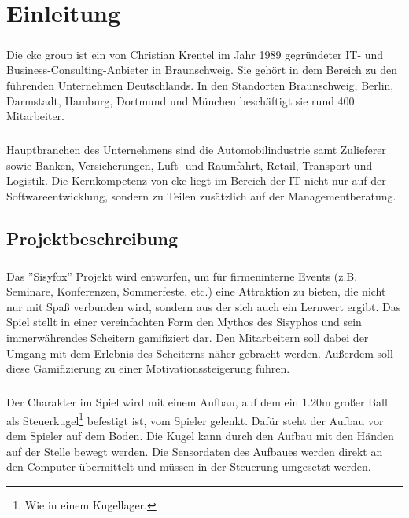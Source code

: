 \chapter{Einleitung}
\paragraph{}
Die ckc group ist ein von Christian Krentel im Jahr 1989 gegründeter IT- und Business-Consulting-Anbieter in Braunschweig. Sie gehört in dem Bereich zu den führenden Unternehmen Deutschlands. In den Standorten Braunschweig, Berlin, Darmstadt, Hamburg, Dortmund und München beschäftigt sie rund 400 Mitarbeiter.
\paragraph{}
Hauptbranchen des Unternehmens sind die Automobilindustrie samt Zulieferer sowie Banken, Versicherungen, Luft- und Raumfahrt, Retail, Transport und Logistik. Die Kernkompetenz von ckc liegt im Bereich der IT nicht nur auf der 
Softwareentwicklung, sondern zu Teilen zusätzlich auf der Managementberatung.

\section{Projektbeschreibung}
\paragraph{}
Das ”Sisyfox” Projekt wird entworfen, um für firmeninterne Events (z.B. Seminare, Konferenzen, Sommerfeste, etc.) eine Attraktion zu bieten, die nicht nur mit Spaß verbunden wird, sondern aus der sich auch ein Lernwert ergibt. 
Das Spiel stellt in einer vereinfachten Form den Mythos des Sisyphos und sein immerwährendes Scheitern gamifiziert dar. Den Mitarbeitern soll dabei der Umgang mit dem Erlebnis des Scheiterns näher gebracht werden. Außerdem soll diese Gamifizierung zu einer Motivationssteigerung führen.
\paragraph{}
Der Charakter im Spiel wird mit einem Aufbau, auf dem ein 1.20m großer Ball als Steuerkugel\footnote{Wie in einem Kugellager.} befestigt ist, vom Spieler gelenkt. Dafür steht der Aufbau vor dem Spieler auf dem Boden. 
Die Kugel kann durch den Aufbau mit den Händen auf der Stelle bewegt werden. Die Sensordaten des Aufbaues werden direkt an den Computer übermittelt und müssen in der Steuerung umgesetzt werden. 
